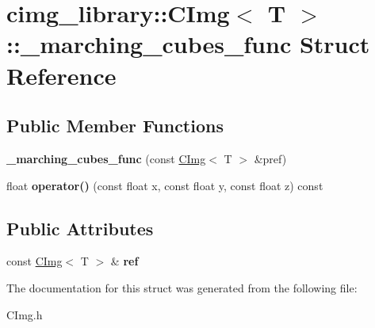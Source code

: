 \hypertarget{structcimg__library_1_1_c_img_1_1__marching__cubes__func}{\section{cimg\-\_\-library\-:\-:C\-Img$<$ T $>$\-:\-:\-\_\-marching\-\_\-cubes\-\_\-func Struct Reference}
\label{structcimg__library_1_1_c_img_1_1__marching__cubes__func}
}
\subsection*{Public Member Functions}
\begin{DoxyCompactItemize}
\item 
\hypertarget{structcimg__library_1_1_c_img_1_1__marching__cubes__func_a05e6c243197d28197fcf521051a67bae}{{\bfseries \-\_\-marching\-\_\-cubes\-\_\-func} (const \hyperlink{structcimg__library_1_1_c_img}{C\-Img}$<$ T $>$ \&pref)}\label{structcimg__library_1_1_c_img_1_1__marching__cubes__func_a05e6c243197d28197fcf521051a67bae}

\item 
\hypertarget{structcimg__library_1_1_c_img_1_1__marching__cubes__func_a16c03f6021a7f77a6226734a009b45ac}{float {\bfseries operator()} (const float x, const float y, const float z) const }\label{structcimg__library_1_1_c_img_1_1__marching__cubes__func_a16c03f6021a7f77a6226734a009b45ac}

\end{DoxyCompactItemize}
\subsection*{Public Attributes}
\begin{DoxyCompactItemize}
\item 
\hypertarget{structcimg__library_1_1_c_img_1_1__marching__cubes__func_a531d40c3d3951d48d1b2c62931722569}{const \hyperlink{structcimg__library_1_1_c_img}{C\-Img}$<$ T $>$ \& {\bfseries ref}}\label{structcimg__library_1_1_c_img_1_1__marching__cubes__func_a531d40c3d3951d48d1b2c62931722569}

\end{DoxyCompactItemize}


The documentation for this struct was generated from the following file\-:\begin{DoxyCompactItemize}
\item 
C\-Img.\-h\end{DoxyCompactItemize}
